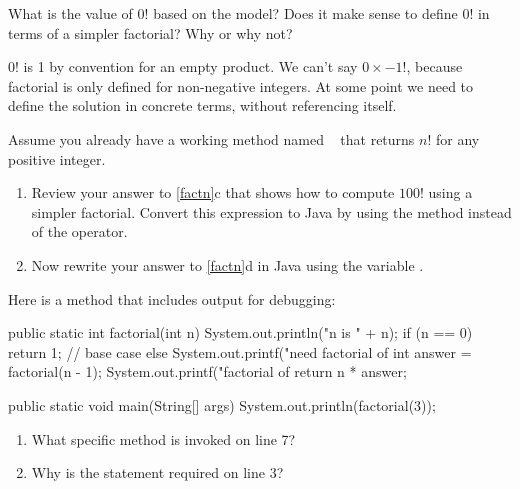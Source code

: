 \Q What is the value of $0!$ based on the model?
Does it make sense to define $0!$ in terms of a simpler factorial?
Why or why not?

\begin{answer}
$0!$ is 1 by convention for an empty product.
We can't say $0 \times -1!$, because factorial is only defined for non-negative integers.
At some point we need to define the solution in concrete terms, without referencing itself.
\end{answer}




\Q Assume you already have a working method named ~ that returns $n!$ for any positive integer.

\begin{enumerate}
\item Review your answer to \ref{factn}c that shows how to compute $100!$ using a simpler factorial.
Convert this expression to Java by using the  method instead of the \java{!} operator.


\item Now rewrite your answer to \ref{factn}d in Java using the variable .

\end{enumerate}


\Q \label{factjava} Here is a  method that includes output for debugging:

\begin{javabox}
public static int factorial(int n) {
    System.out.println("n is " + n);
    if (n == 0) {
        return 1;  // base case
    } else {
        System.out.printf("need factorial of %
        int answer = factorial(n - 1);
        System.out.printf("factorial of %
        return n * answer;
    }
}

public static void main(String[] args) {
    System.out.println(factorial(3));
}
\end{javabox}

\begin{enumerate}
\item What specific method is invoked on line 7?


\item Why is the  statement required on line 3?

\end{enumerate}


